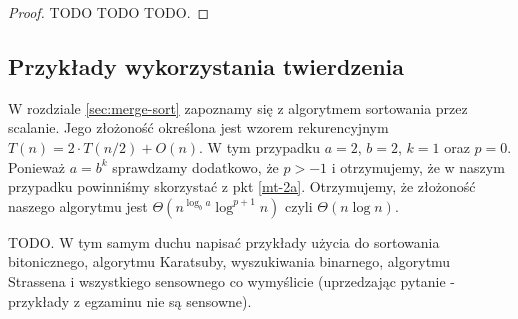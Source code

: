 \begin{proof}
 TODO TODO TODO.
\end{proof}

\subsection{Przykłady wykorzystania twierdzenia}

W rozdziale \ref{sec:merge-sort} zapoznamy się z algorytmem sortowania przez scalanie.
Jego złożoność określona jest wzorem rekurencyjnym $T(n) = 2 \cdot T(n/2) + O(n)$.
W tym przypadku $a = 2$, $b = 2$, $k = 1$ oraz $p = 0$.
Ponieważ $a = b^k$ sprawdzamy dodatkowo, że $p > -1$ i otrzymujemy, że w naszym przypadku powinniśmy skorzystać z pkt \ref{mt-2a}.
Otrzymujemy, że złożoność naszego algorytmu jest $\Theta(n^{\log_b a} \log^{p + 1} n)$ czyli $\Theta(n \log n)$.

TODO. W tym samym duchu napisać przykłady użycia do sortowania bitonicznego, algorytmu Karatsuby, wyszukiwania binarnego, algorytmu Strassena i wszystkiego sensownego co wymyślicie (uprzedzając pytanie - przykłady z egzaminu nie są sensowne).
